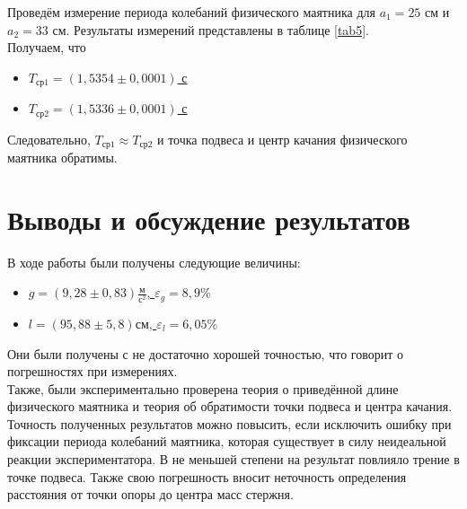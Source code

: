 \documentclass[a4paper,12pt]{article} %
\begin{document}
Проведём измерение периода колебаний физического маятника для $ a_1=25 $ см и $ a_2=33 $ см. Результаты измерений представлены в таблице \ref{tab5}.\\

Получаем, что
\begin{itemize}
	\item \underline{$ T_{\text{ср}1} = \left( 1,5354\pm0,0001 \right) $ с}
	\item \underline{$ T_{\text{ср}2} = \left( 1,5336\pm0,0001 \right) $ с}
\end{itemize}
Следовательно, $ T_{\text{ср}1} \approx T_{\text{ср}2} $ и точка подвеса и центр качания физического маятника обратимы.

\section{Выводы и обсуждение результатов}

В ходе работы были получены следующие величины:
\begin{itemize}
	\item \underline{$ g = \left( 9,28\pm0,83\right) \frac{\text{м}}{\text{с}^2} $, $ \varepsilon_g=8,9\% $}
	\item \underline{$ l = \left( 95,88\pm5,8\right) \text{см} $, $ \varepsilon_l=6,05\% $}
\end{itemize}
Они были получены с не достаточно хорошей точностью, что говорит о погрешностях при измерениях.\\
Также, были экспериментально проверена теория о приведённой длине физического маятника и теория об обратимости точки подвеса и центра качания.
Точность полученных результатов можно повысить, если исключить ошибку при фиксации периода колебаний маятника, которая существует в силу неидеальной реакции экспериментатора. В не меньшей степени на результат повлияло трение в точке подвеса. Также свою погрешность вносит неточность определения расстояния от точки опоры до центра масс стержня.
\end{document}
